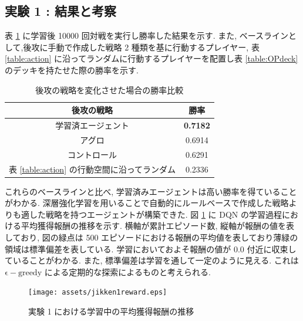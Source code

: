 \documentclass[12pt]{jarticle}
\begin{document}
\subsection{実験 1 : 結果と考察}
表 \ref{table:winratejikken1} に学習後 10000 回対戦を実行し勝率した結果を示す. また, ベースラインとして,後攻に手動で作成した戦略 2 種類を基に行動するプレイヤー, 表 \ref{table:action} に沿ってランダムに行動するプレイヤーを配置し表 \ref{table:OPdeck} のデッキを持たせた際の勝率を示す. 
\begin{table}[ht]
  \centering
  \caption{後攻の戦略を変化させた場合の勝率比較}
  \label{table:winratejikken1}
  \begin{tabular}{|c|c|}
  \hline
  後攻の戦略        & 勝率     \\ \hline \hline
  学習済エージェント    & \textbf{0.7182} \\ \hline
  アグロ          & 0.6914 \\ \hline
  コントロール       & 0.6291 \\ \hline
  表 \ref{table:action} の行動空間に沿ってランダム & 0.2336       \\ \hline
  \end{tabular}
  \end{table}
  これらのベースラインと比べ, 学習済みエージェントは高い勝率を得ていることがわかる. 深層強化学習を用いることで自動的にルールベースで作成した戦略よりも適した戦略を持つエージェントが構築できた.
  図 \ref{fig:jikken1reward} に DQN の学習過程における平均獲得報酬の推移を示す. 横軸が累計エピソード数, 縦軸が報酬の値を表しており, 図の緑点は 500 エピソードにおける報酬の平均値を表しており薄緑の領域は標準偏差を表している. 学習においておよそ報酬の値が 0.0 付近に収束していることがわかる. また, 標準偏差は学習を通して一定のように見える. これは $\mathrm{\epsilon-greedy}$ による定期的な探索によるものと考えられる.
  \begin{figure}[ht]
    \centering
    \texttt{[image: assets/jikken1reward.eps]}
    \vspace{-0.3cm}
    \caption{実験 1 における学習中の平均獲得報酬の推移}
    \label{fig:jikken1reward}
  \end{figure}
  
\end{document}
